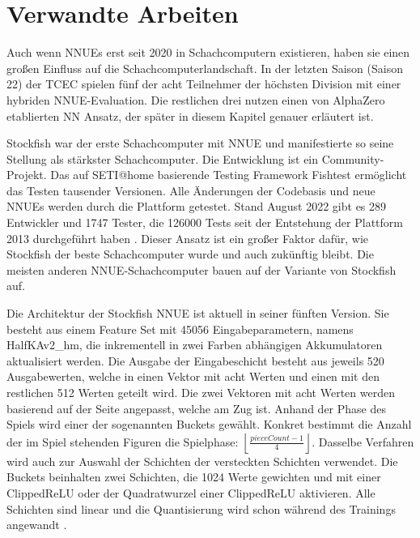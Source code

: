 \chapter{Verwandte Arbeiten}
\label{chap:relatedWork}

Auch wenn \acp{NNUE} erst seit 2020 in Schachcomputern existieren, haben sie einen großen Einfluss auf die Schachcomputerlandschaft. In der letzten Saison (Saison 22) der \ac{TCEC} \cite{TCEC22} spielen fünf der acht Teilnehmer der höchsten Division mit einer hybriden \ac{NNUE}-Evaluation. Die restlichen drei nutzen einen von AlphaZero etablierten \ac{NN} Ansatz, der später in diesem Kapitel genauer erläutert ist.


Stockfish war der erste Schachcomputer mit \ac{NNUE} und manifestierte so seine Stellung als stärkster Schachcomputer. Die Entwicklung ist ein Community-Projekt. Das auf SETI@home \cite{SETI2001} basierende Testing Framework Fishtest ermöglicht das Testen tausender Versionen. Alle Änderungen der Codebasis und neue \acp{NNUE} werden durch die Plattform getestet. Stand August 2022 gibt es 289 Entwickler und 1747 Tester, die 126000 Tests seit der Entstehung der Plattform 2013 durchgeführt haben \cite{FishtestUsers}. Dieser Ansatz ist ein großer Faktor dafür, wie Stockfish der beste Schachcomputer wurde und auch zukünftig bleibt. Die meisten anderen \ac{NNUE}-Schachcomputer bauen auf der Variante von Stockfish auf.
 
Die Architektur der Stockfish \ac{NNUE} ist aktuell in seiner fünften Version. Sie besteht aus einem Feature Set mit 45056 Eingabeparametern, namens HalfKAv2\_hm, die inkrementell in zwei Farben abhängigen Akkumulatoren aktualisiert werden. Die Ausgabe der Eingabeschicht besteht aus jeweils 520 Ausgabewerten, welche in einen Vektor mit acht Werten und einen mit den restlichen 512 Werten geteilt wird. Die zwei Vektoren mit acht Werten werden basierend auf der Seite angepasst, welche am Zug ist. Anhand der Phase des Spiels wird einer der sogenannten Buckets gewählt. Konkret bestimmt die Anzahl der im Spiel stehenden Figuren die Spielphase: $\left \lfloor\frac{pieceCount-1}{4}\right \rfloor$. Dasselbe Verfahren wird auch zur Auswahl der Schichten der versteckten Schichten verwendet. Die Buckets beinhalten zwei Schichten, die 1024 Werte gewichten und mit einer Clipped\ac{ReLU} oder der Quadratwurzel einer Clipped\ac{ReLU} aktivieren. Alle Schichten sind linear und die Quantisierung wird schon während des Trainings angewandt \cite{StockfishNNUE}.

